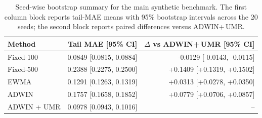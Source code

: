 \begin{table}[!htbp]
\centering
\caption{Seed-wise bootstrap summary for the main synthetic benchmark. The first column block reports tail-MAE means with 95\% bootstrap intervals across the 20 seeds; the second block reports paired differences versus ADWIN+$\,$UMR.}
\label{tab:bootstrap_tail_mae}
\begin{tabular}{lrr}
\toprule
Method & Tail MAE [95\% CI] & $\Delta$ vs ADWIN+$\,$UMR [95\% CI] \\
\midrule
Fixed-100 & 0.0849 [0.0815, 0.0884] & -0.0129 [-0.0143, -0.0115] \\
Fixed-500 & 0.2388 [0.2275, 0.2500] & +0.1409 [+0.1319, +0.1502] \\
EWMA & 0.1291 [0.1263, 0.1319] & +0.0313 [+0.0278, +0.0350] \\
ADWIN & 0.1757 [0.1658, 0.1852] & +0.0779 [+0.0706, +0.0857] \\
ADWIN + UMR & 0.0978 [0.0943, 0.1016] & -- \\
\bottomrule
\end{tabular}
\end{table}
